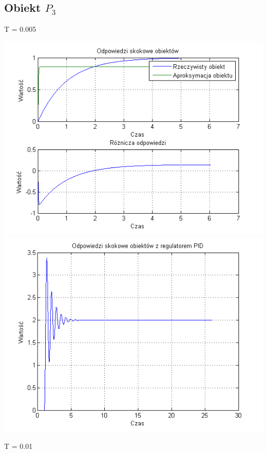 \documentclass[10pt,a4paper]{article}
\begin{document}
\subsection{Obiekt $P_3$}
T = 0.005
\begin{center}
\includegraphics[scale=1]{images/dwa/skrypt_85.png}\\
\includegraphics[scale=1]{images/dwa/skrypt_86.png}\\
\end{center}
\newpage
T = 0.01
\end{document}
